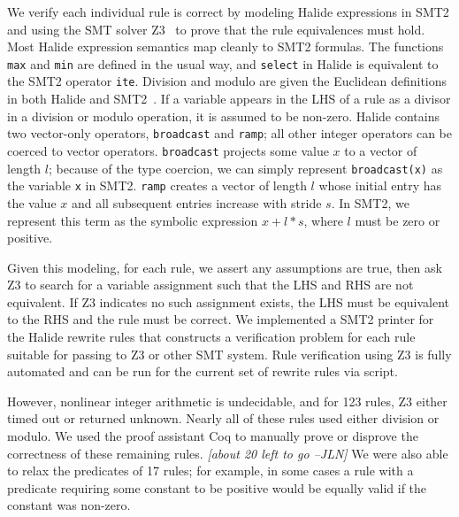 \documentclass[sigplan,10pt,review,anonymous]{acmart}\settopmatter{printfolios=true,printccs=false,printacmref=false}
\newcommand{\jln}[1]{\textcolor{uwpurple}{\textit{[{#1} --JLN]}}}
\newcommand{\NumPredicatesRelaxed}{{\color{red} 17}\xspace}
\begin{document}
We verify each individual rule is correct by modeling Halide expressions in SMT2
and using the SMT solver Z3~\cite{de2008z3} to prove that the rule equivalences must hold.
Most Halide expression semantics map cleanly
to SMT2 formulas. The functions \texttt{max} and \texttt{min} are defined in
the usual way, and \texttt{select} in Halide is equivalent to the SMT2 operator
\texttt{ite}. Division and modulo are given the Euclidean definitions in both
Halide and SMT2~\cite{boute1992euclidean}. If a variable appears in the LHS of a rule as a divisor in a
division or modulo operation, it is assumed to be non-zero. %
Halide contains two vector-only operators, \texttt{broadcast} and \texttt{ramp}; all
other integer operators can be coerced to vector operators. 
\texttt{broadcast} projects some value $x$ to a vector of length $l$; because of
the type coercion, we can simply represent \texttt{broadcast(x)} as the variable
\texttt{x} in SMT2. \texttt{ramp} creates a vector of length $l$
whose initial entry has the value $x$ and all subsequent entries increase with
stride $s$. In SMT2, we represent this term as the symbolic expression $x + l *
s$, where $l$ must be zero or positive.

Given this modeling, for each rule, we assert any assumptions are true, then
ask Z3 to search for a variable assignment such that the LHS and RHS are not
equivalent.  If Z3 indicates no such assignment exists, the LHS must be equivalent to
the RHS and the rule must be correct. We implemented a SMT2 printer for the
Halide rewrite rules that constructs a verification problem for each rule
suitable for passing to Z3 or other SMT system.  Rule verification using Z3 is fully automated
and can be run for the current set of rewrite rules via script.

However, nonlinear integer arithmetic is undecidable, and for 123
rules, Z3 either timed out or returned unknown. Nearly all of these rules used
either division or modulo. We used the proof assistant Coq to manually prove or
disprove the correctness of these remaining rules. \jln{about 20 left to go} We
were also able to relax the predicates of \NumPredicatesRelaxed rules; for example, in some cases a rule
with a predicate requiring some constant to be positive would be equally valid
if the constant was non-zero.
\end{document}

